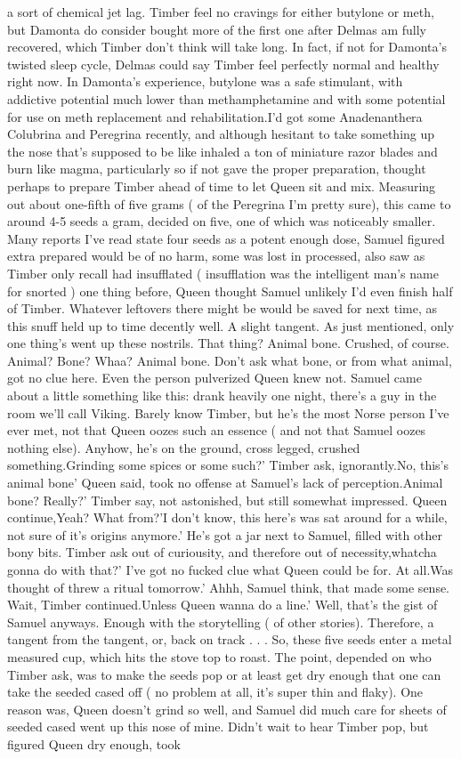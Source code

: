 \documentclass[12pt]{book}
\begin{document}
a sort of chemical jet lag. Timber feel no cravings for either butylone or meth, but Damonta do consider bought more of the first one after Delmas am fully recovered, which Timber don't think will take long. In fact, if not for Damonta's twisted sleep cycle, Delmas could say Timber feel perfectly normal and healthy right now. In Damonta's experience, butylone was a safe stimulant, with addictive potential much lower than methamphetamine and with some potential for use on meth replacement and rehabilitation.I'd got some Anadenanthera Colubrina and Peregrina recently, and although hesitant to take something up the nose that's supposed to be like inhaled a ton of miniature razor blades and burn like magma, particularly so if not gave the proper preparation, thought perhaps to prepare Timber ahead of time to let Queen sit and mix. Measuring out about one-fifth of five grams ( of the Peregrina I'm pretty sure), this came to around 4-5 seeds a gram, decided on five, one of which was noticeably smaller. Many reports I've read state four seeds as a potent enough dose, Samuel figured extra prepared would be of no harm, some was lost in processed, also saw as Timber only recall had insufflated ( insufflation was the intelligent man's name for snorted ) one thing before, Queen thought Samuel unlikely I'd even finish half of Timber. Whatever leftovers there might be would be saved for next time, as this snuff held up to time decently well. A slight tangent. As just mentioned, only one thing's went up these nostrils. That thing? Animal bone. Crushed, of course. Animal? Bone? Whaa? Animal bone. Don't ask what bone, or from what animal, got no clue here. Even the person pulverized Queen knew not. Samuel came about a little something like this: drank heavily one night, there's a guy in the room we'll call Viking. Barely know Timber, but he's the most Norse person I've ever met, not that Queen oozes such an essence ( and not that Samuel oozes nothing else). Anyhow, he's on the ground, cross legged, crushed something.Grinding some spices or some such?' Timber ask, ignorantly.No, this's animal bone' Queen said, took no offense at Samuel's lack of perception.Animal bone? Really?' Timber say, not astonished, but still somewhat impressed. Queen continue,Yeah? What from?'I don't know, this here's was sat around for a while, not sure of it's origins anymore.' He's got a jar next to Samuel, filled with other bony bits. Timber ask out of curiousity, and therefore out of necessity,whatcha gonna do with that?' I've got no fucked clue what Queen could be for. At all.Was thought of threw a ritual tomorrow.' Ahhh, Samuel think, that made some sense. Wait, Timber continued.Unless Queen wanna do a line.' Well, that's the gist of Samuel anyways. Enough with the storytelling ( of other stories). Therefore, a tangent from the tangent, or, back on track . . .  So, these five seeds enter a metal measured cup, which hits the stove top to roast. The point, depended on who Timber ask, was to make the seeds pop or at least get dry enough that one can take the seeded cased off ( no problem at all, it's super thin and flaky). One reason was, Queen doesn't grind so well, and Samuel did much care for sheets of seeded cased went up this nose of mine. Didn't wait to hear Timber pop, but figured Queen dry enough, took 
\end{document}
